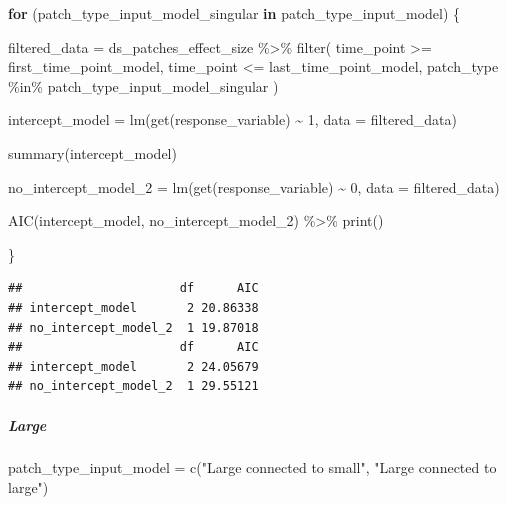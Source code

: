 \documentclass[
]{article}
\newenvironment{Shaded}{\begin{snugshade}}{\end{snugshade}}
\newcommand{\AttributeTok}[1]{\textcolor[rgb]{0.77,0.63,0.00}{#1}}
\newcommand{\ControlFlowTok}[1]{\textcolor[rgb]{0.13,0.29,0.53}{\textbf{#1}}}
\newcommand{\DecValTok}[1]{\textcolor[rgb]{0.00,0.00,0.81}{#1}}
\newcommand{\FunctionTok}[1]{\textcolor[rgb]{0.00,0.00,0.00}{#1}}
\newcommand{\NormalTok}[1]{#1}
\newcommand{\OtherTok}[1]{\textcolor[rgb]{0.56,0.35,0.01}{#1}}
\newcommand{\SpecialCharTok}[1]{\textcolor[rgb]{0.00,0.00,0.00}{#1}}
\newcommand{\StringTok}[1]{\textcolor[rgb]{0.31,0.60,0.02}{#1}}
\begin{document}
\begin{Shaded}
\begin{Highlighting}[]
\ControlFlowTok{for}\NormalTok{ (patch\_type\_input\_model\_singular }\ControlFlowTok{in}\NormalTok{ patch\_type\_input\_model) \{}
  
\NormalTok{  filtered\_data }\OtherTok{=}\NormalTok{ ds\_patches\_effect\_size }\SpecialCharTok{\%\textgreater{}\%}
    \FunctionTok{filter}\NormalTok{(}
\NormalTok{        time\_point }\SpecialCharTok{\textgreater{}=}\NormalTok{ first\_time\_point\_model,}
\NormalTok{        time\_point }\SpecialCharTok{\textless{}=}\NormalTok{ last\_time\_point\_model,}
\NormalTok{        patch\_type }\SpecialCharTok{\%in\%}\NormalTok{ patch\_type\_input\_model\_singular}
\NormalTok{    )}
  
\NormalTok{  intercept\_model }\OtherTok{=} \FunctionTok{lm}\NormalTok{(}\FunctionTok{get}\NormalTok{(response\_variable) }\SpecialCharTok{\textasciitilde{}}
                         \DecValTok{1}\NormalTok{,}
                       \AttributeTok{data =}\NormalTok{ filtered\_data)}
  
  \FunctionTok{summary}\NormalTok{(intercept\_model)}
  
\NormalTok{  no\_intercept\_model\_2 }\OtherTok{=} \FunctionTok{lm}\NormalTok{(}\FunctionTok{get}\NormalTok{(response\_variable) }\SpecialCharTok{\textasciitilde{}}
                              \DecValTok{0}\NormalTok{,}
                            \AttributeTok{data =}\NormalTok{ filtered\_data)}
  
  \FunctionTok{AIC}\NormalTok{(intercept\_model, no\_intercept\_model\_2) }\SpecialCharTok{\%\textgreater{}\%}
    \FunctionTok{print}\NormalTok{()}
  
\NormalTok{\}}
\end{Highlighting}
\end{Shaded}

\begin{verbatim}
##                      df      AIC
## intercept_model       2 20.86338
## no_intercept_model_2  1 19.87018
##                      df      AIC
## intercept_model       2 24.05679
## no_intercept_model_2  1 29.55121
\end{verbatim}

\hypertarget{large-1}{%
\subparagraph{Large}\label{large-1}}

\begin{Shaded}
\begin{Highlighting}[]
\NormalTok{patch\_type\_input\_model }\OtherTok{=} \FunctionTok{c}\NormalTok{(}\StringTok{"Large connected to small"}\NormalTok{,}
                           \StringTok{"Large connected to large"}\NormalTok{)}
\end{Highlighting}
\end{Shaded}
\end{document}
